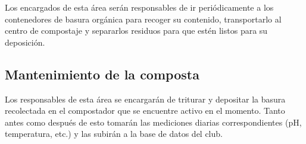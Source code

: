 Los encargados de esta área serán responsables de ir periódicamente a los contenedores de basura orgánica para recoger su contenido, transportarlo al centro de compostaje y separarlos residuos para que estén listos para su deposición.

\subsection{Mantenimiento de la composta}

Los responsables de esta área se encargarán de triturar y depositar la basura recolectada en el compostador que se encuentre activo en el momento. Tanto antes como después de esto tomarán las mediciones diarias correspondientes (pH, temperatura, etc.) y las subirán a la base de datos del club.
